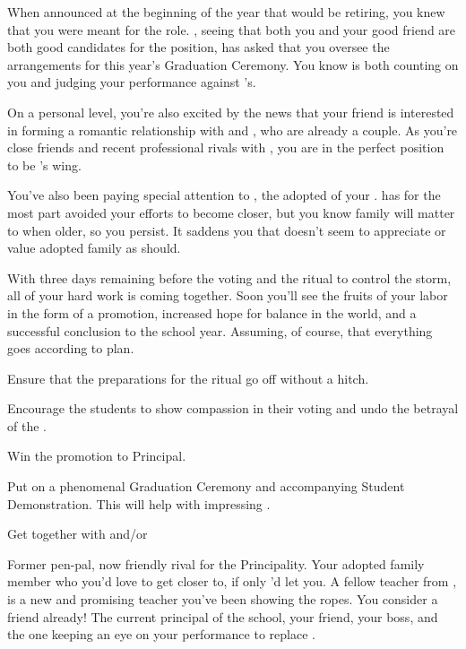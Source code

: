 \documentclass[char]{GL2020}
\begin{document}
When \cPrincipal{} announced at the beginning of the year that \cPrincipal{\they} would be retiring, you knew that you were meant for the role. \cPrincipal{}, seeing that both you and your good friend \cBeetle{} are both good candidates for the position, has asked that you oversee the arrangements for this year’s Graduation Ceremony.  You know \cPrincipal{} is both counting on you and judging your performance against \cBeetle{}’s.  

On a personal level, you’re also excited by the news that your friend \cInterpol{} is interested in forming a romantic relationship with \cBeetle{} and \cJuniorStatesman{}, who are already a couple.  As you’re close friends and recent professional rivals with \cBeetle{}, you are in the perfect position to be \cInterpol{}’s wing\cMusic{\person}.

You’ve also been paying special attention to \cAdopted{}, the adopted \cAdopted{\child} of your . \cAdopted{} has for the most part avoided your efforts to become closer, but you know family will matter to \cAdopted{\them} when \cAdopted{\theyare} older, so you persist. It saddens you that \cAdopted{} doesn’t seem to appreciate or value \cAdopted{\their} adopted family as \cAdopted{\they} should.

With three days remaining before the voting and the ritual to control the storm, all of your hard work is coming together.  Soon you’ll see the fruits of your labor in the form of a promotion, increased hope for balance in the world, and a successful conclusion to the school year. Assuming, of course, that everything goes according to plan.

\begin{itemz}[Goals]
	\item Ensure that the preparations for the ritual go off without a hitch.
	\item Encourage the students to show compassion in their voting and undo the betrayal of the \pShip{}.
	\item Win the promotion to Principal.
\item Put on a phenomenal Graduation Ceremony and accompanying Student Demonstration. This will help with impressing \cPrincipal{}.
\item Get \cInterpol{} together with \cBeetle{} and/or \cJuniorStatesman{}
\end{itemz}

\begin{itemz}[Notes]
	\item 
\end{itemz}

\begin{contacts}
	\contact{\cBeetle{}} Former pen-pal, now friendly rival for the Principality.
	\contact{\cAdopted{}} Your adopted family member who you’d love to get closer to, if only \cAdopted{\they}’d let you.
	\contact{\cInterpol{}} A fellow teacher from \pFarm{}, \cInterpol is a new and promising teacher you’ve been showing the ropes.  You consider \cInterpol{\them} a friend already!
\contact{\cPrincipal{}} The current principal of the school, your friend, your boss, and the one keeping an eye on your performance to replace \cPrincipal{\them}.
\end{contacts}
\end{document}
